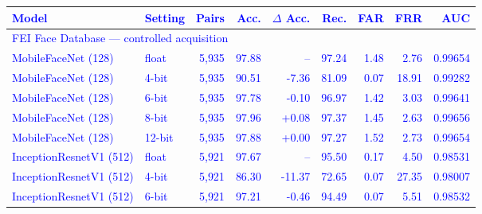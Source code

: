 \begin{tabular}{@{}llrrrrrrr@{}}
\toprule
\textcolor{blue}{Model} & \textcolor{blue}{Setting} & \textcolor{blue}{Pairs} & \textcolor{blue}{Acc.} & \textcolor{blue}{$\Delta$ Acc.} & \textcolor{blue}{Rec.} & \textcolor{blue}{FAR} & \textcolor{blue}{FRR} & \textcolor{blue}{AUC} \\
\midrule
\multicolumn{9}{l}{\textcolor{blue}{FEI Face Database --- controlled acquisition}} \\
\textcolor{blue}{MobileFaceNet (128)} & \textcolor{blue}{float} & \textcolor{blue}{5{,}935} & \textcolor{blue}{97.88} & \textcolor{blue}{--} & \textcolor{blue}{97.24} & \textcolor{blue}{1.48} & \textcolor{blue}{2.76} & \textcolor{blue}{0.99654} \\
\textcolor{blue}{MobileFaceNet (128)} & \textcolor{blue}{4-bit} & \textcolor{blue}{5{,}935} & \textcolor{blue}{90.51} & \textcolor{blue}{-7.36} & \textcolor{blue}{81.09} & \textcolor{blue}{0.07} & \textcolor{blue}{18.91} & \textcolor{blue}{0.99282} \\
\textcolor{blue}{MobileFaceNet (128)} & \textcolor{blue}{6-bit} & \textcolor{blue}{5{,}935} & \textcolor{blue}{97.78} & \textcolor{blue}{-0.10} & \textcolor{blue}{96.97} & \textcolor{blue}{1.42} & \textcolor{blue}{3.03} & \textcolor{blue}{0.99641} \\
\textcolor{blue}{MobileFaceNet (128)} & \textcolor{blue}{8-bit} & \textcolor{blue}{5{,}935} & \textcolor{blue}{97.96} & \textcolor{blue}{+0.08} & \textcolor{blue}{97.37} & \textcolor{blue}{1.45} & \textcolor{blue}{2.63} & \textcolor{blue}{0.99656} \\
\textcolor{blue}{MobileFaceNet (128)} & \textcolor{blue}{12-bit} & \textcolor{blue}{5{,}935} & \textcolor{blue}{97.88} & \textcolor{blue}{+0.00} & \textcolor{blue}{97.27} & \textcolor{blue}{1.52} & \textcolor{blue}{2.73} & \textcolor{blue}{0.99654} \\
\textcolor{blue}{InceptionResnetV1 (512)} & \textcolor{blue}{float} & \textcolor{blue}{5{,}921} & \textcolor{blue}{97.67} & \textcolor{blue}{--} & \textcolor{blue}{95.50} & \textcolor{blue}{0.17} & \textcolor{blue}{4.50} & \textcolor{blue}{0.98531} \\
\textcolor{blue}{InceptionResnetV1 (512)} & \textcolor{blue}{4-bit} & \textcolor{blue}{5{,}921} & \textcolor{blue}{86.30} & \textcolor{blue}{-11.37} & \textcolor{blue}{72.65} & \textcolor{blue}{0.07} & \textcolor{blue}{27.35} & \textcolor{blue}{0.98007} \\
\textcolor{blue}{InceptionResnetV1 (512)} & \textcolor{blue}{6-bit} & \textcolor{blue}{5{,}921} & \textcolor{blue}{97.21} & \textcolor{blue}{-0.46} & \textcolor{blue}{94.49} & \textcolor{blue}{0.07} & \textcolor{blue}{5.51} & \textcolor{blue}{0.98532} \\

\end{tabular}
